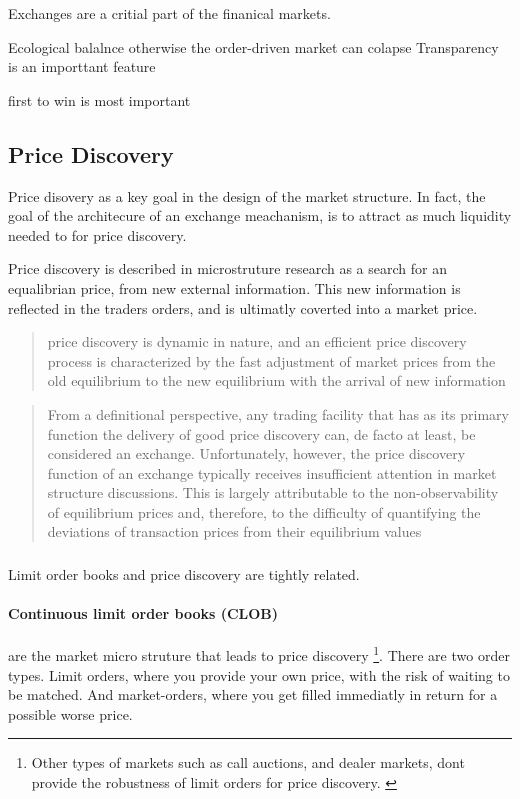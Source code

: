 \documentclass[12pt]{article}
\begin{document}
Exchanges are a critial part of the finanical markets.  

Ecological balalnce otherwise the order-driven market can colapse 
Transparency is an importtant feature 

first to win is most important 


\subsection*{Price Discovery}
Price disovery as a key goal in the design of the market structure. In fact, the goal of the architecure of an exchange meachanism, is to attract as much liquidity needed to for price discovery.  \cite{francioni_schwartz_2017}

Price discovery is described in microstruture research as a search for an equalibrian price, from new external information. This new information is reflected in the traders orders, and is ultimatly coverted into a market price. \citep{RePEc:nbr:nberwo:6257}

\begin{quote}
    price discovery is dynamic in nature, and an efficient price discovery process is characterized by the fast adjustment of market prices from the old equilibrium to the new equilibrium with the arrival of new information \cite{RePEc:udb:wpaper:uwec-2005-01-r}    
\end{quote}


\begin{quote}
From a definitional perspective, any trading facility that has as its primary function the delivery of good price discovery can, de facto at least, be considered an exchange. Unfortunately, however, the price discovery function of an  exchange typically receives insufficient attention in market structure discussions. This is largely attributable to the non-observability of equilibrium prices and, therefore, to the difficulty of quantifying the deviations of transaction prices from their equilibrium values \cite{francioni_schwartz_2017}
\end{quote} 


\subsubsection*{} Limit order books and price discovery are tightly related. \citep{RePEc:nbr:nberwo:6257} \cite{RePEc:eee:jfinec:v:17:y:1986:i:1:p:5-26}

\paragraph*{Continuous limit order books (CLOB)}   are the market micro struture that leads to price discovery \footnote{Other types of markets such as call auctions, and dealer markets, dont provide the robustness of limit orders for price discovery. \cite{RePEc:hal:journl:hal-00459785}}. There are two order types. Limit orders, where you provide your own price, with the risk of waiting to be matched. And market-orders, where you get filled immediatly in return for a possible worse price.
\end{document}
